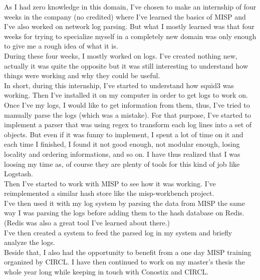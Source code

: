 \documentclass{eplmastersthesis}
\begin{document}
As I had zero knowledge in this domain, I've chosen to make an internship of four weeks in the company (no credited) where I've learned the basics of MISP and I've also worked on network log parsing. But what I mostly learned was that four weeks for trying to specialize myself in a completely new domain was only enough to give me a rough idea of what it is.\\
During these four weeks, I mostly worked on logs. I've created nothing new, actually it was quite the opposite but it was still interesting to understand how things were working and why they could be useful. \\
In short, during this internship, I've started to understand how squid3 was working. Then I've installed it on my computer in order to get logs to work on.\\
Once I've my logs, I would like to get information from them, thus, I've tried to manually parse the logs (which was a mistake). For that purpose, I've started to implement a parser that was using regex to transform each log lines into a set of objects. But even if it was funny to implement, I spent a lot of time on it and each time I finished, I found it not good enough, not modular enough, losing locality and ordering informations, and so on. I have thus realized that I was loosing my time as, of course they are plenty of tools for this kind of job like Logstash.\\
Then I've started to work with MISP to see how it was working. I've reimplemented a similar hash store like the misp-workbench project.\\
I've then used it with my log system by parsing the data from MISP the same way I was parsing the logs before adding them to the hash database on Redis.\\
(Redis was also a great tool I've learned about there.)\\
I've then created a system to feed the parsed log in my system and briefly analyze the logs.\\
Beside that, I also had the opportunity to benefit from a one day MISP training organized by CIRCL.
I have then continued to work on my master's thesis the whole year long while keeping in touch with Conostix and CIRCL.
\end{document}
